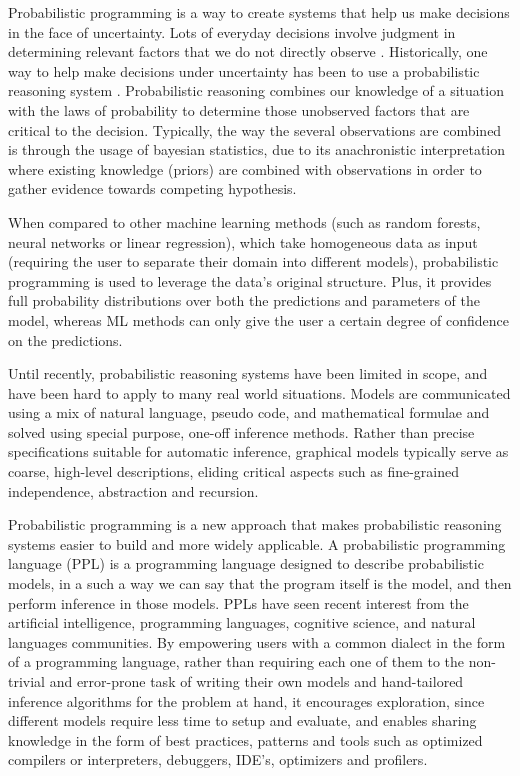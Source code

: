 Probabilistic programming is a way to create systems that help us make decisions
in the face of uncertainty. Lots of everyday decisions involve judgment in
determining relevant factors that we do not directly observe \cite{Szolovits1993}. Historically,
one way to help make decisions under uncertainty has been to use a probabilistic
reasoning system \cite{Lassiter2012}. Probabilistic reasoning combines our knowledge of a situation
with the laws of probability to determine those unobserved factors that are
critical to the decision. Typically, the way the several observations are
combined is through the usage of bayesian statistics, due to its anachronistic
interpretation where existing knowledge (priors) are combined with observations
in order to gather evidence towards competing hypothesis.

When compared to other machine learning methods (such as random forests, neural
networks or linear regression), which take homogeneous data as input (requiring
the user to separate their domain into different models), probabilistic
programming is used to leverage the data’s original structure. Plus, it provides
full probability distributions over both the predictions and parameters of the
model, whereas ML methods can only give the user a certain degree of confidence
on the predictions.

Until recently, probabilistic reasoning systems have been limited in scope, and
have been hard to apply to many real world situations. Models are communicated
using a mix of natural language, pseudo code, and mathematical formulae and solved
using special purpose, one-off inference methods. Rather than precise
specifications suitable for automatic inference, graphical models typically
serve as coarse, high-level descriptions, eliding critical aspects such as
fine-grained independence, abstraction and recursion.

Probabilistic programming is a new approach that makes probabilistic reasoning
systems easier to build and more widely applicable. A probabilistic programming
language (PPL) is a programming language designed to describe probabilistic
models, in a such a way we can say that the program itself is the model, and
then perform inference in those models. PPLs have seen recent interest from the
artificial intelligence, programming languages, cognitive science, and natural
languages communities. By empowering users with a common dialect in the form of
a programming language, rather than requiring each one of them to the
non-trivial and error-prone task of writing their own models and hand-tailored
inference algorithms for the problem at hand, it encourages exploration, since
different models require less time to setup and evaluate, and enables sharing
knowledge in the form of best practices, patterns and tools such as optimized
compilers or interpreters, debuggers, IDE’s, optimizers and profilers.

